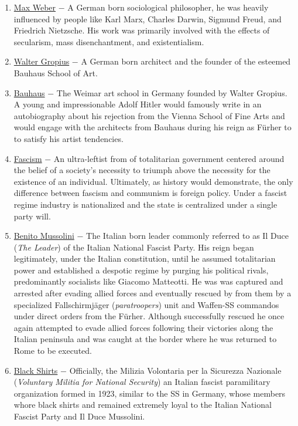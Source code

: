 \documentclass[12pt]{article}
\begin{document}
\begin{flushleft}
\begin{enumerate}
\item \underline{Max Weber} $-$ A German born sociological philosopher, he was heavily influenced by people like Karl Marx, Charles Darwin, Sigmund Freud, and Friedrich Nietzsche. His work was primarily involved with the effects of secularism, mass disenchantment, and existentialism.

\item \underline{Walter Gropius} $-$ A German born architect and the founder of the esteemed Bauhaus School of Art.

\item \underline{Bauhaus} $-$ The Weimar art school in Germany founded by Walter Gropius. A young and impressionable Adolf Hitler would famously write in an autobiography about his rejection from the Vienna School of Fine Arts and would engage with the architects from Bauhaus during his reign as F\"urher to to satisfy his artist tendencies.

\item \underline{Fascism} $-$ An ultra-leftist from of totalitarian government centered around the belief of a society's necessity to triumph above the necessity for the existence of an individual. Ultimately, as history would demonstrate, the only difference between fascism and communism is foreign policy. Under a fascist regime industry is nationalized and the state is centralized under a single party will.

\item \underline{Benito Mussolini} $-$ The Italian born leader commonly referred to as Il Duce (\emph{The Leader}) of the Italian National Fascist Party. His reign began legitimately, under the Italian constitution, until he assumed totalitarian power and established a despotic regime by purging his political rivals, predominantly socialists like Giacomo Matteotti. He was was captured and arrested after evading allied forces and eventually rescued by from them by a specialized Fallschirmj\"ager (\emph{paratroopers}) unit and Waffen-SS commandos under direct orders from the F\"urher. Although successfully rescued he once again attempted to evade allied forces following their victories along the Italian peninsula and was caught at the border where he was returned to Rome to be executed.

\item \underline{Black Shirts} $-$ Officially, the Milizia Volontaria per la Sicurezza Nazionale (\emph{Voluntary Militia for National Security}) an Italian fascist paramilitary organization formed in 1923, similar to the SS in Germany, whose members whore black shirts and remained extremely loyal to the Italian National Fascist Party and Il Duce Mussolini. 


\end{enumerate}
\end{flushleft}
\end{document}
